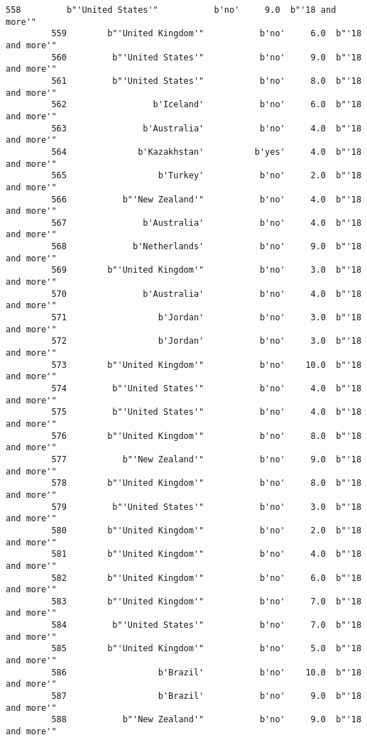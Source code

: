 \documentclass[11pt]{article}
\begin{document}
\begin{Verbatim}[commandchars=\\\{\}]
         558         b"'United States'"           b'no'     9.0  b"'18 and more'"   
         559        b"'United Kingdom'"           b'no'     6.0  b"'18 and more'"   
         560         b"'United States'"           b'no'     9.0  b"'18 and more'"   
         561         b"'United States'"           b'no'     8.0  b"'18 and more'"   
         562                 b'Iceland'           b'no'     6.0  b"'18 and more'"   
         563               b'Australia'           b'no'     4.0  b"'18 and more'"   
         564              b'Kazakhstan'          b'yes'     4.0  b"'18 and more'"   
         565                  b'Turkey'           b'no'     2.0  b"'18 and more'"   
         566           b"'New Zealand'"           b'no'     4.0  b"'18 and more'"   
         567               b'Australia'           b'no'     4.0  b"'18 and more'"   
         568             b'Netherlands'           b'no'     9.0  b"'18 and more'"   
         569        b"'United Kingdom'"           b'no'     3.0  b"'18 and more'"   
         570               b'Australia'           b'no'     4.0  b"'18 and more'"   
         571                  b'Jordan'           b'no'     3.0  b"'18 and more'"   
         572                  b'Jordan'           b'no'     3.0  b"'18 and more'"   
         573        b"'United Kingdom'"           b'no'    10.0  b"'18 and more'"   
         574         b"'United States'"           b'no'     4.0  b"'18 and more'"   
         575         b"'United States'"           b'no'     4.0  b"'18 and more'"   
         576        b"'United Kingdom'"           b'no'     8.0  b"'18 and more'"   
         577           b"'New Zealand'"           b'no'     9.0  b"'18 and more'"   
         578        b"'United Kingdom'"           b'no'     8.0  b"'18 and more'"   
         579         b"'United States'"           b'no'     3.0  b"'18 and more'"   
         580        b"'United Kingdom'"           b'no'     2.0  b"'18 and more'"   
         581        b"'United Kingdom'"           b'no'     4.0  b"'18 and more'"   
         582        b"'United Kingdom'"           b'no'     6.0  b"'18 and more'"   
         583        b"'United Kingdom'"           b'no'     7.0  b"'18 and more'"   
         584         b"'United States'"           b'no'     7.0  b"'18 and more'"   
         585        b"'United Kingdom'"           b'no'     5.0  b"'18 and more'"   
         586                  b'Brazil'           b'no'    10.0  b"'18 and more'"   
         587                  b'Brazil'           b'no'     9.0  b"'18 and more'"   
         588           b"'New Zealand'"           b'no'     9.0  b"'18 and more'"   

\end{Verbatim}
\end{document}
